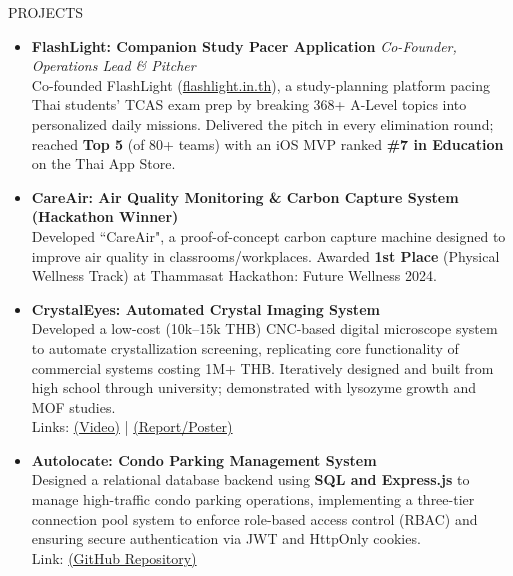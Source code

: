 \documentclass[11pt]{resume} %
\begin{document}
\begin{rSection}{PROJECTS}
    \begin{itemize}[leftmargin=*]
        \item \textbf{FlashLight: Companion Study Pacer Application} \hfill \textit{Co-Founder, Operations Lead \& Pitcher} \\
        Co-founded FlashLight (\href{https://flashlight.in.th}{flashlight.in.th}), a study-planning platform pacing Thai students' TCAS exam prep by breaking 368+ A-Level topics into personalized daily missions. Delivered the pitch in every elimination round; reached \textbf{Top 5} (of 80+ teams) with an iOS MVP ranked \textbf{\#7 in Education} on the Thai App Store.

        \item \textbf{CareAir: Air Quality Monitoring \& Carbon Capture System (Hackathon Winner)} \\ Developed ``CareAir", a proof-of-concept carbon capture machine designed to improve air quality in classrooms\slash workplaces. Awarded \textbf{1st Place} (Physical Wellness Track) at Thammasat Hackathon: Future Wellness 2024.

        \item \textbf{CrystalEyes: Automated Crystal Imaging System} \\ Developed a low-cost (10k--15k THB) CNC-based digital microscope system to automate crystallization screening, replicating core functionality of commercial systems costing 1M+ THB. Iteratively designed and built from high school through university; demonstrated with lysozyme growth and MOF studies. \\ Links: \href{https://youtu.be/uhPnnxGZzjI}{(Video)} | \href{https://drive.google.com/drive/folders/1st1oj2_nghs2p9U-4JLflPOut1JF-Zu-?usp=sharing}{(Report/Poster)}

        \item \textbf{Autolocate: Condo Parking Management System} \\ Designed a relational database backend using \textbf{SQL and Express.js} to manage high-traffic condo parking operations, implementing a three-tier connection pool system to enforce role-based access control (RBAC) and ensuring secure authentication via JWT and HttpOnly cookies. \\ Link: \href{https://github.com/Warit-Yuv/Autolocate_Backend}{(GitHub Repository)}

    \end{itemize}
\end{rSection}
\end{document}
